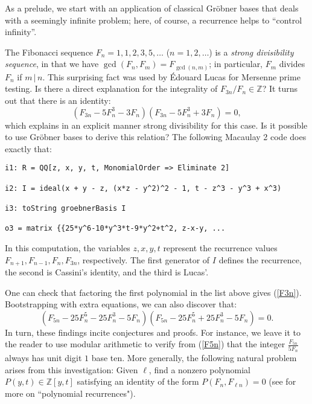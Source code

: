 As a prelude, we start with an application of classical Gr\"obner bases that deals with a seemingly infinite problem; here, of course, a recurrence helps to ``control infinity''.  

The Fibonacci sequence $F_n = 1,1,2,3,5,\ldots$ ($n= 1, 2, \ldots$) is a \textit{strong divisibility sequence}, in that we have $\gcd(F_n, F_m) = F_{\gcd(n,m)}$; in particular, $F_m$ divides $F_n$ if $m \, | \, n$.  This surprising fact was used by \'Edouard Lucas for Mersenne prime testing.  Is there a direct explanation for the integrality of $F_{3n}/F_n \in \mathbb Z$?  It turns out that there is an identity:
\begin{equation}\label{F3n}
(F_{3n} - 5 F_n^3 - 3 F_n)(F_{3n} - 5 F_n^3 + 3 F_n) = 0,
\end{equation}
which explains in an explicit manner strong divisibility for this case.   Is it possible to use Gr\"obner bases to derive this relation?  The following Macaulay 2 code does exactly that:
\begin{M2}
\begin{verbatim}
i1: R = QQ[z, x, y, t, MonomialOrder => Eliminate 2]

i2: I = ideal(x + y - z, (x*z - y^2)^2 - 1, t - z^3 - y^3 + x^3)

i3: toString groebnerBasis I

o3 = matrix {{25*y^6-10*y^3*t-9*y^2+t^2, z-x-y, ...
\end{verbatim}
\end{M2}  
In this computation, the variables $z,x,y,t$ represent the recurrence values \mbox{$F_{n+1}, F_{n-1}, F_n, F_{3n}$,} respectively.  The first generator of $I$ defines the recurrence, the second is Cassini's identity, and the third is Lucas'.

One can check that factoring the first polynomial in the list above gives (\ref{F3n}).  Bootstrapping with extra equations, we can also discover that:
\begin{equation}\label{F5n}
(F_{5n} - 25 F_n^5 - 25 F_n^3 - 5 F_n)(F_{5n} - 25 F_n^5 + 25 F_n^3 - 5 F_n) = 0.
\end{equation}
In turn, these findings incite conjectures and proofs.  
For instance, we leave it to the reader to use modular arithmetic to verify from (\ref{F5n}) that the integer $\frac{F_{5n}}{5F_n}$ always has unit digit $1$ base ten.  
More generally, the following natural problem arises from this investigation:  Given $\ell$, find a nonzero polynomial $P(y, t) \in \mathbb Z[y, t]$ satisfying an identity of the form $P(F_n, F_{\ell n}) = 0$ (see \cite{HilLev:07} for more on ``polynomial recurrences").

